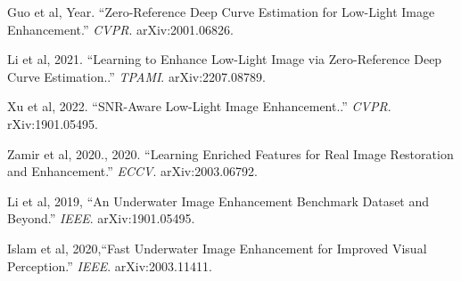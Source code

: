 \documentclass[11pt, letterpaper]{article}
\begin{document}
\begin{enumerate}[label={[\arabic*]},leftmargin=*]
  \item Guo et al, Year. ``Zero-Reference Deep Curve Estimation for Low-Light Image Enhancement.'' \textit{CVPR}. arXiv:2001.06826.
  \item Li et al, 2021. ``Learning to Enhance Low-Light Image via Zero-Reference Deep Curve Estimation..'' \textit{TPAMI}. arXiv:2207.08789.
  \item Xu et al, 2022. ``SNR-Aware Low-Light Image Enhancement..'' \textit{CVPR}. rXiv:1901.05495.
  \item Zamir et al, 2020., 2020. ``Learning Enriched Features for Real Image Restoration and Enhancement.'' \textit{ECCV}. arXiv:2003.06792.
  \item Li et al, 2019, ``An Underwater Image Enhancement Benchmark Dataset and Beyond.'' \textit{IEEE}. arXiv:1901.05495.
  \item Islam et al, 2020,``Fast Underwater Image Enhancement for Improved Visual Perception.'' \textit{IEEE}. arXiv:2003.11411.
  
\end{enumerate}
\end{document}
